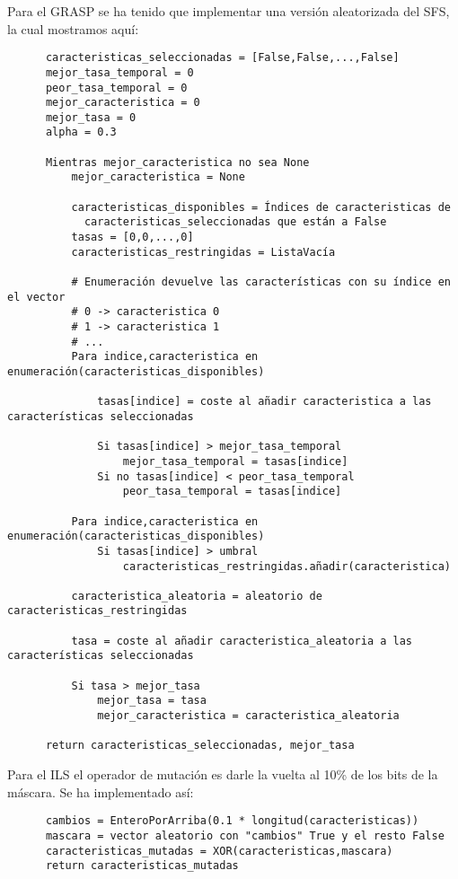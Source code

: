 \documentclass[a4paper, 11pt]{article}
\begin{document}
    Para el GRASP se ha tenido que implementar una versión aleatorizada del SFS, la cual mostramos aquí:

    \begin{verbatim}
      caracteristicas_seleccionadas = [False,False,...,False]
      mejor_tasa_temporal = 0
      peor_tasa_temporal = 0
      mejor_caracteristica = 0
      mejor_tasa = 0
      alpha = 0.3

      Mientras mejor_caracteristica no sea None
          mejor_caracteristica = None

          caracteristicas_disponibles = Índices de caracteristicas de
            caracteristicas_seleccionadas que están a False
          tasas = [0,0,...,0]
          caracteristicas_restringidas = ListaVacía

          # Enumeración devuelve las características con su índice en el vector
          # 0 -> caracteristica 0
          # 1 -> caracteristica 1
          # ...
          Para indice,caracteristica en enumeración(caracteristicas_disponibles)

              tasas[indice] = coste al añadir caracteristica a las características seleccionadas

              Si tasas[indice] > mejor_tasa_temporal
                  mejor_tasa_temporal = tasas[indice]
              Si no tasas[indice] < peor_tasa_temporal
                  peor_tasa_temporal = tasas[indice]

          Para indice,caracteristica en enumeración(caracteristicas_disponibles)
              Si tasas[indice] > umbral
                  caracteristicas_restringidas.añadir(caracteristica)

          caracteristica_aleatoria = aleatorio de caracteristicas_restringidas

          tasa = coste al añadir caracteristica_aleatoria a las características seleccionadas

          Si tasa > mejor_tasa
              mejor_tasa = tasa
              mejor_caracteristica = caracteristica_aleatoria

      return caracteristicas_seleccionadas, mejor_tasa
    \end{verbatim}

    \newpage
    Para el ILS el operador de mutación es darle la vuelta al 10\% de los bits de la máscara. Se ha implementado así:

    \begin{verbatim}
      cambios = EnteroPorArriba(0.1 * longitud(caracteristicas))
      mascara = vector aleatorio con "cambios" True y el resto False
      caracteristicas_mutadas = XOR(caracteristicas,mascara)
      return caracteristicas_mutadas
    \end{verbatim}
\end{document}
